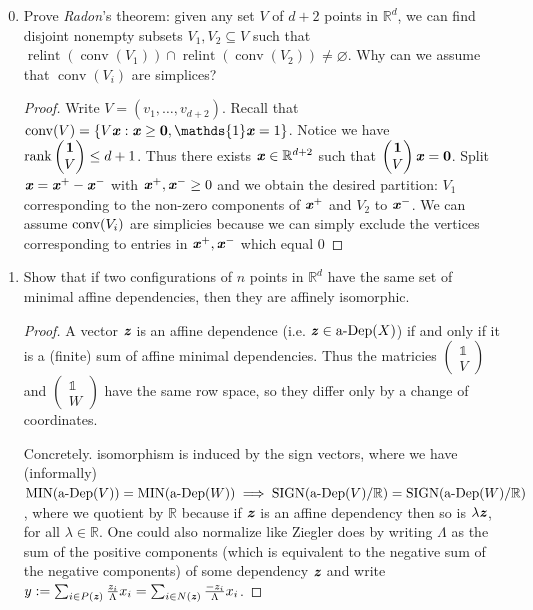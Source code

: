 \documentclass{article}
\begin{document}
\begin{enumerate}
\setcounter{enumi}{-1}
\renewcommand{\labelenumi}{6.\arabic{enumi}}
\item Prove \emph{Radon}'s theorem: given any set $V$ of $d+2$ points in $\mathbb{R}^d$, we can find disjoint nonempty subsets $V_1,V_2\subseteq V$ such that $\operatorname{relint}(\operatorname{conv}(V_1))\cap \operatorname{relint}(\operatorname{conv}(V_2))\neq \varnothing$. Why can we assume that $\operatorname{conv}(V_i)$ are simplices?

\begin{proof}
    Write $V = (v_1, \ldots, v_{d+2})$. Recall that $\conv(V) = \{V\bi{x}: \bi{x} \geq \textbf{0}, \mathds{1}\bi{x} = 1\}$. Notice we have $\operatorname{rank} \begin{pmatrix}
        \textbf{1} \\ V
    \end{pmatrix} \leq d+1$. Thus there exists $\textbf{\textit{x}} \in \mathbb{R}^{d+2}$ such that $\begin{pmatrix}
        \textbf{1} \\ V
    \end{pmatrix}\textbf{\textit{x}} = \textbf{0}$. Split $\textbf{\textit{x}} = \textbf{\textit{x}}^+ - \textbf{\textit{x}}^-$ with $\textbf{\textit{x}}^+, \textbf{\textit{x}}^- \geq 0$ and we obtain the desired partition: $V_1$ corresponding to the non-zero components of $\textbf{\textit{x}}^+$ and $V_2$ to $\textbf{\textit{x}}^-$. We can assume $\operatorname{conv}(V_i)$ are simplicies because we can simply exclude the vertices corresponding to entries in $\textbf{\textit{x}}^+, \textbf{\textit{x}}^-$ which equal $0$
\end{proof}

\item Show that if two configurations of $n$ points in $\mathbb{R}^d$ have the same set of minimal affine dependencies, then they are affinely isomorphic.

\begin{proof}
    A vector $\textbf{\textit{z}}$ is an affine dependence (i.e. $\textbf{\textit{z}} \in \operatorname{a-Dep}(X)$) if and only if it is a (finite) sum of affine minimal dependencies. Thus the matricies $\begin{pmatrix}
        \mathds{1} \\ V
    \end{pmatrix}$ and $\begin{pmatrix}
        \mathds{1} \\ W
    \end{pmatrix}$ have the same row space, so they differ only by a change of coordinates.
    
    Concretely. isomorphism is induced by the sign vectors, where we have (informally) $\operatorname{MIN}(\operatorname{a-Dep}(V)) = \operatorname{MIN}(\operatorname{a-Dep}(W)) \implies \operatorname{SIGN}(\operatorname{a-Dep}(V) / \mathbb{R}) = \operatorname{SIGN}(\operatorname{a-Dep}(W) / \mathbb{R})$, where we quotient by $\mathbb{R}$ because if $\textbf{\textit{z}}$ is an affine dependency then so is $\lambda\textbf{\textit{z}}$, for all $\lambda \in \mathbb{R}$. One could also normalize like Ziegler does by writing $\Lambda$ as the sum of the positive components (which is equivalent to the negative sum of the negative components) of some dependency $\textbf{\textit{z}}$ and write $y:=\sum_{i\in P(\textbf{\textit{z}})} \frac{z_i}{\Lambda}x_i = \sum_{i\in N(\textbf{\textit{z}})} \frac{-z_i}{\Lambda}x_i $.
\end{proof}


\end{enumerate}
\end{document}
